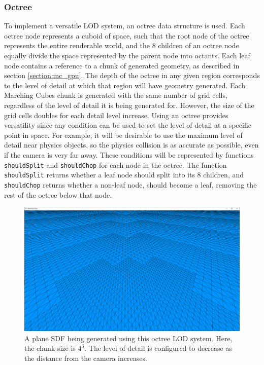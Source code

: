 \documentclass{article}
\begin{document}
\subsubsection{Octree}
\label{section:octree}
To implement a versatile LOD system, an octree data structure is used. %
Each octree node represents a cuboid of space, such that the root node of the octree represents the entire renderable world, and the 8 children of an octree node equally divide the space represented by the parent node into octants. Each leaf node contains a reference to a chunk of generated geometry, as described in section \ref{section:mc_gpu}. The depth of the octree in any given region corresponds to the level of detail at which that region will have geometry generated. Each Marching Cubes chunk is generated with the same number of grid cells, regardless of the level of detail it is being generated for. However, the size of the grid cells doubles for each detail level increase. Using an octree provides versatility since any condition can be used to set the level of detail at a specific point in space. For example, it will be desirable to use the maximum level of detail near physics objects, so the physics collision is as accurate as possible, even if the camera is very far away. These conditions will be represented by functions \texttt{shouldSplit} and \texttt{shouldChop} for each node in the octree. The function \texttt{shouldSplit} returns whether a leaf node should split into its 8 children, and \texttt{shouldChop} returns whether a non-leaf node, should become a leaf, removing the rest of the octree below that node.

\begin{figure}[H]
  \includegraphics[width=\textwidth]{octree_plane.png}
  \caption{A plane SDF being generated using this octree LOD system. Here, the chunk size is $4^3$. The level of detail is configured to decrease as the distance from the camera increases.}
\end{figure}
\end{document}
